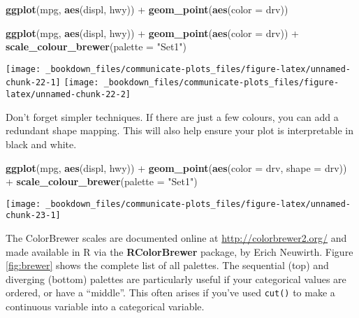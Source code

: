 \documentclass[]{book}
\newenvironment{Shaded}{\begin{snugshade}}{\end{snugshade}}
\newcommand{\KeywordTok}[1]{\textcolor[rgb]{0.13,0.29,0.53}{\textbf{{#1}}}}
\newcommand{\DataTypeTok}[1]{\textcolor[rgb]{0.13,0.29,0.53}{{#1}}}
\newcommand{\StringTok}[1]{\textcolor[rgb]{0.31,0.60,0.02}{{#1}}}
\newcommand{\NormalTok}[1]{{#1}}
\begin{document}
\begin{Shaded}
\begin{Highlighting}[]
\KeywordTok{ggplot}\NormalTok{(mpg, }\KeywordTok{aes}\NormalTok{(displ, hwy)) +}
\StringTok{  }\KeywordTok{geom_point}\NormalTok{(}\KeywordTok{aes}\NormalTok{(}\DataTypeTok{color =} \NormalTok{drv))}

\KeywordTok{ggplot}\NormalTok{(mpg, }\KeywordTok{aes}\NormalTok{(displ, hwy)) +}
\StringTok{  }\KeywordTok{geom_point}\NormalTok{(}\KeywordTok{aes}\NormalTok{(}\DataTypeTok{color =} \NormalTok{drv)) +}
\StringTok{  }\KeywordTok{scale_colour_brewer}\NormalTok{(}\DataTypeTok{palette =} \StringTok{"Set1"}\NormalTok{)}
\end{Highlighting}
\end{Shaded}

\texttt{[image: \_bookdown\_files/communicate-plots\_files/figure-latex/unnamed-chunk-22-1]}
\texttt{[image: \_bookdown\_files/communicate-plots\_files/figure-latex/unnamed-chunk-22-2]}

Don't forget simpler techniques. If there are just a few colours, you
can add a redundant shape mapping. This will also help ensure your plot
is interpretable in black and white.

\begin{Shaded}
\begin{Highlighting}[]
\KeywordTok{ggplot}\NormalTok{(mpg, }\KeywordTok{aes}\NormalTok{(displ, hwy)) +}
\StringTok{  }\KeywordTok{geom_point}\NormalTok{(}\KeywordTok{aes}\NormalTok{(}\DataTypeTok{color =} \NormalTok{drv, }\DataTypeTok{shape =} \NormalTok{drv)) +}
\StringTok{  }\KeywordTok{scale_colour_brewer}\NormalTok{(}\DataTypeTok{palette =} \StringTok{"Set1"}\NormalTok{)}
\end{Highlighting}
\end{Shaded}

\begin{center}\texttt{[image: \_bookdown\_files/communicate-plots\_files/figure-latex/unnamed-chunk-23-1]} \end{center}

The ColorBrewer scales are documented online at
\url{http://colorbrewer2.org/} and made available in R via the
\textbf{RColorBrewer} package, by Erich Neuwirth. Figure
\ref{fig:brewer} shows the complete list of all palettes. The sequential
(top) and diverging (bottom) palettes are particularly useful if your
categorical values are ordered, or have a ``middle''. This often arises
if you've used \texttt{cut()} to make a continuous variable into a
categorical variable.
\end{document}
